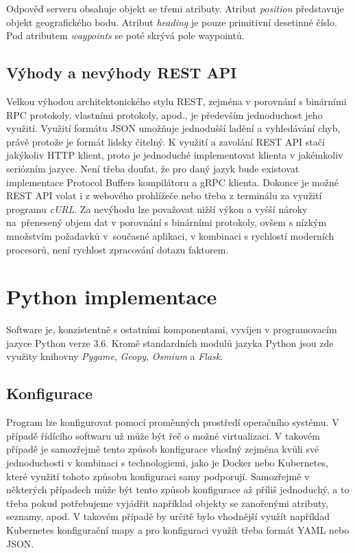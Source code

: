 \documentclass[czech, bachelor]{diploma}
\begin{document}
Odpověď serveru obsahuje objekt se třemi atributy. Atribut \emph{position} představuje objekt geografického bodu. Atribut
\emph{heading} je pouze primitivní desetinné číslo. Pod atributem \emph{waypoints} se poté skrývá pole waypointů.

\subsection{Výhody a nevýhody REST API}

Velkou výhodou architektonického stylu REST, zejména v porovnání s binárními RPC protokoly, vlastními protokoly, apod., je
především jednoduchost jeho využití. Využití formátu JSON umožňuje jednodušší ladění a vyhledávání chyb, právě protože je formát
lidsky čitelný. K využití a zavolání REST API stačí jakýkoliv HTTP klient, proto je jednoduché implementovat klienta v jakémkoliv
seriózním jazyce. Není třeba doufat, že pro daný jazyk bude existovat implementace Protocol Buffers kompilátoru a gRPC klienta.
Dokonce je možné REST API volat i z webového prohlížeče nebo třeba z terminálu za využití programu \emph{cURL}. Za nevýhodu lze
považovat nižší výkon a vyšší nároky na~přenesený objem dat v porovnání s binárními protokoly, ovšem s nízkým množstvím požadavků
v~současné aplikaci, v kombinaci s rychlostí moderních procesorů, není rychlost zpracování dotazu faktorem.

\section{Python implementace}

Software je, konzistentně s ostatními komponentami, vyvíjen v programovacím jazyce Python verze 3.6. Kromě standardních modulů
jazyka Python jsou zde využity knihovny \emph{Pygame}, \emph{Geopy}, \emph{Osmium} a \emph{Flask}.

\subsection{Konfigurace}

Program lze konfigurovat pomocí proměnných prostředí operačního systému. V případě řídícího softwaru už může být řeč o možné
virtualizaci. V takovém případě je samozřejmě tento způsob konfigurace vhodný zejména kvůli své jednoduchosti v kombinaci
s technologiemi, jako je Docker nebo Kubernetes, které využití tohoto způsobu konfiguraci samy podporují. Samozřejmě v některých
případech může být tento způsob konfigurace až příliš jednoduchý, a to třeba pokud potřebujeme vyjádřit například objekty
se zanořenými atributy, seznamy, apod. V takovém případě by určitě bylo vhodnější využít například Kubernetes konfigurační mapy
a pro konfiguraci využít třeba formát YAML nebo JSON.
\end{document}
